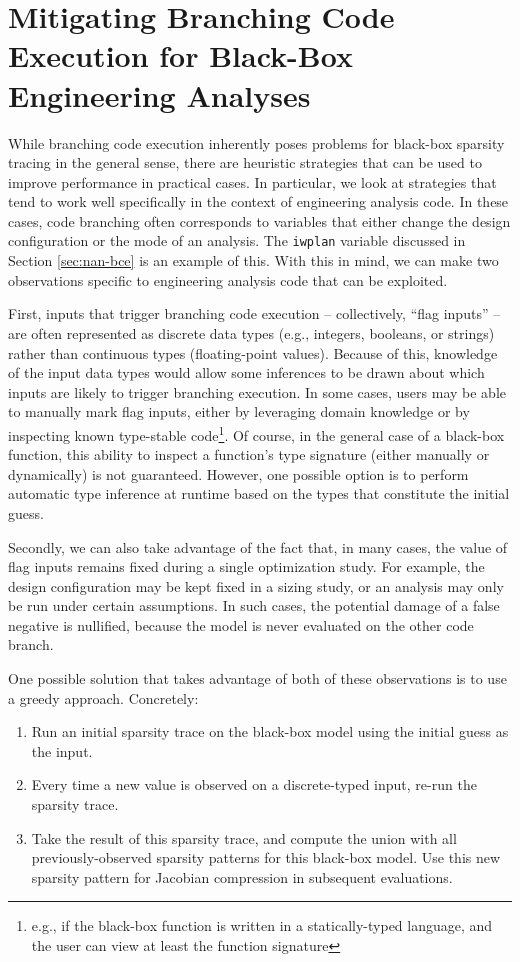 \section{Mitigating Branching Code Execution for Black-Box Engineering Analyses}

While branching code execution inherently poses problems for black-box sparsity tracing in the general sense, there are heuristic strategies that can be used to improve performance in practical cases. In particular, we look at strategies that tend to work well specifically in the context of engineering analysis code. In these cases, code branching often corresponds to variables that either change the design configuration or the mode of an analysis. The \texttt{iwplan} variable discussed in Section \ref{sec:nan-bce} is an example of this. With this in mind, we can make two observations specific to engineering analysis code that can be exploited.

First, inputs that trigger branching code execution -- collectively, ``flag inputs'' -- are often represented as discrete data types (e.g., integers, booleans, or strings) rather than continuous types (floating-point values). Because of this, knowledge of the input data types would allow some inferences to be drawn about which inputs are likely to trigger branching execution. In some cases, users may be able to manually mark flag inputs, either by leveraging domain knowledge or by inspecting known type-stable code\footnote{e.g., if the black-box function is written in a statically-typed language, and the user can view at least the function signature}. Of course, in the general case of a black-box function, this ability to inspect a function's type signature (either manually or dynamically) is not guaranteed. However, one possible option is to perform automatic type inference at runtime based on the types that constitute the initial guess.

Secondly, we can also take advantage of the fact that, in many cases, the value of flag inputs remains fixed during a single optimization study. For example, the design configuration may be kept fixed in a sizing study, or an analysis may only be run under certain assumptions. In such cases, the potential damage of a false negative is nullified, because the model is never evaluated on the other code branch.

One possible solution that takes advantage of both of these observations is to use a greedy approach. Concretely:

\begin{enumerate}
    \item Run an initial sparsity trace on the black-box model using the initial guess as the input.
    \item Every time a new value is observed on a discrete-typed input, re-run the sparsity trace.
    \item Take the result of this sparsity trace, and compute the union with all previously-observed sparsity patterns for this black-box model. Use this new sparsity pattern for Jacobian compression in subsequent evaluations.
\end{enumerate}

